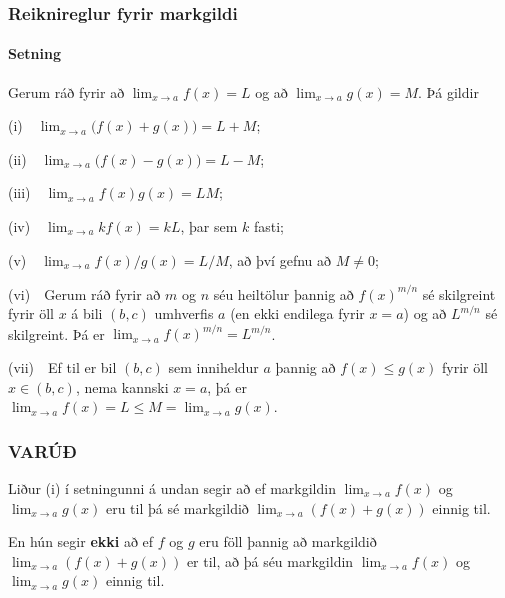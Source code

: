 \documentclass[icelandic,a4paper,12pt]{article}
\begin{document}
\subsubsection*{Reiknireglur fyrir markgildi}
\pause
 \paragraph{Setning}
   Gerum ráð fyrir að
$\lim_{x\rightarrow a}f(x)=L$ og að   $\lim_{x\rightarrow a}g(x)=M$.
Þá gildir

\pause

(i)\ \ $\lim_{x\rightarrow a}\Big(f(x)+g(x)\Big)=L+M$;

(ii)\  \ $\lim_{x\rightarrow a}\Big(f(x)-g(x)\Big)=L-M$;

\pause

(iii)\ \  $\lim_{x\rightarrow a}f(x)g(x)=LM$;

(iv)\ \  $\lim_{x\rightarrow a}kf(x)=kL$, þar sem $k$ fasti;

(v)\ \  $\lim_{x\rightarrow a}f(x)/g(x)=L/M$, að því gefnu að $M\neq 0$;

\pause

(vi)\ \ Gerum ráð fyrir að $m$ og $n$ séu 
heiltölur þannig að $f(x)^{m/n}$ sé
  skilgreint fyrir öll $x$ á bili $(b,c)$ umhverfis $a$ (en ekki
  endilega fyrir $x=a$) og að $L^{m/n}$ sé skilgreint.
Þá er $\lim_{x\rightarrow a}f(x)^{m/n}=L^{m/n}$.

\pause

(vii)\ \   Ef til er bil $(b,c)$ sem inniheldur $a$ þannig 
að $f(x)\leq g(x)$ fyrir öll $x\in (b,c)$, nema kannski $x=a$, þá 
er $\lim_{x\rightarrow a}f(x)=L\leq M=\lim_{x\rightarrow a}g(x)$.

 


\subsubsection*{VARÚÐ}
	Liður (i) í setningunni á undan segir að ef markgildin
	$\lim_{x\to a} f(x)$ og $\lim_{x\to a} g(x)$ eru til þá
	sé markgildið
	$\lim_{x\to a} (f(x)+g(x))$ einnig til.

\bigskip\pause

	En hún segir {\bf ekki} að ef 
	$f$ og $g$ eru föll þannig að markgildið
	$\lim_{x\to a} (f(x)+g(x))$ er til, að þá séu markgildin
	$\lim_{x\to a} f(x)$ og $\lim_{x\to a} g(x)$ einnig til.
\end{document}
